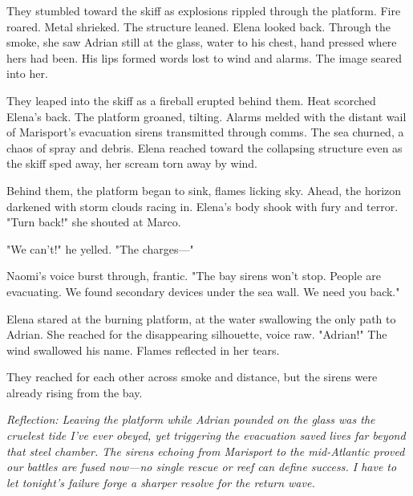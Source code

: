 They stumbled toward the skiff as explosions rippled through the platform. Fire roared. Metal shrieked. The structure leaned. Elena looked back. Through the smoke, she saw Adrian still at the glass, water to his chest, hand pressed where hers had been. His lips formed words lost to wind and alarms. The image seared into her.

They leaped into the skiff as a fireball erupted behind them. Heat scorched Elena's back. The platform groaned, tilting. Alarms melded with the distant wail of Marisport's evacuation sirens transmitted through comms. The sea churned, a chaos of spray and debris. Elena reached toward the collapsing structure even as the skiff sped away, her scream torn away by wind.

Behind them, the platform began to sink, flames licking sky. Ahead, the horizon darkened with storm clouds racing in. Elena's body shook with fury and terror. "Turn back!" she shouted at Marco.

"We can't!" he yelled. "The charges—"

Naomi's voice burst through, frantic. "The bay sirens won't stop. People are evacuating. We found secondary devices under the sea wall. We need you back."

Elena stared at the burning platform, at the water swallowing the only path to Adrian. She reached for the disappearing silhouette, voice raw. "Adrian!" The wind swallowed his name. Flames reflected in her tears.

They reached for each other across smoke and distance, but the sirens were already rising from the bay.


\noindent\textit{Reflection: Leaving the platform while Adrian pounded on the glass was the cruelest tide I've ever obeyed, yet triggering the evacuation saved lives far beyond that steel chamber. The sirens echoing from Marisport to the mid-Atlantic proved our battles are fused now—no single rescue or reef can define success. I have to let tonight's failure forge a sharper resolve for the return wave.}
